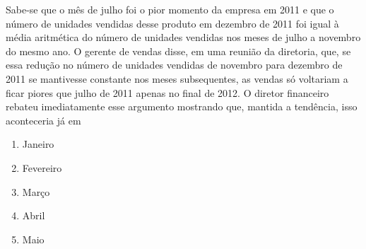 \begin{enumerate}
\begin{center}
  \end{center}

  
  Sabe-se que o mês de julho foi o pior momento da empresa em 2011 e que o número de unidades vendidas desse produto em dezembro de 2011 foi igual à média aritmética do número de unidades vendidas nos meses de julho a novembro do mesmo ano. O gerente de vendas disse, em uma reunião da diretoria, que, se essa redução no número de unidades vendidas de novembro para dezembro de 2011 se mantivesse constante nos meses subsequentes, as vendas só voltariam a ficar piores que julho de 2011 apenas no final de 2012. O diretor financeiro rebateu imediatamente esse argumento mostrando que, mantida a tendência, isso aconteceria já em

  \begin{enumerate}
  \item Janeiro
  \item Fevereiro
  \item Março
  \item Abril
  \item Maio
  \end{enumerate}
\end{enumerate}

\ifnum{}
\clearpage
\else
\notasfinais
\fi




\nocite{*}